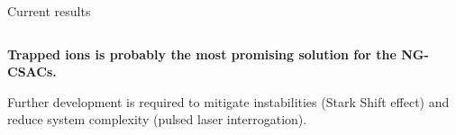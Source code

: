 \begin{frame}{Current results}
\begin{columns}[c, onlytextwidth]
\begin{column}{0.5\textwidth}
        \end{column}

    \end{columns}

    \vspace{10pt}

    \textbf{Trapped ions is probably the most promising solution for the NG-CSACs.}

    Further development is required to mitigate instabilities (Stark Shift effect) and reduce system complexity (pulsed laser interrogation).


\end{frame}